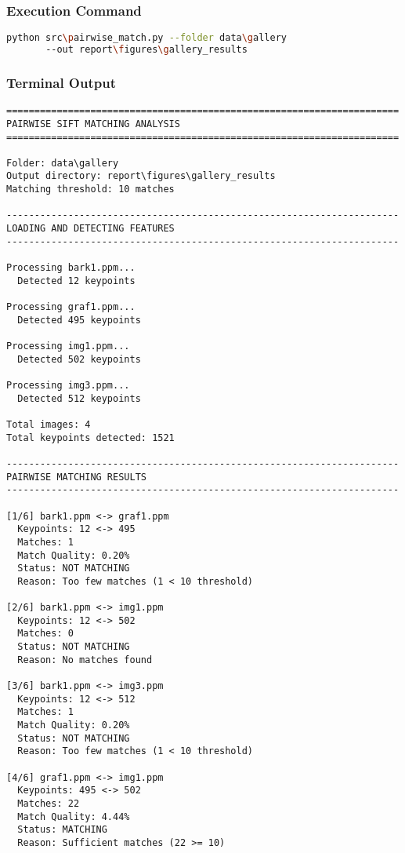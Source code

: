 \documentclass[12pt,a4paper]{article}
\begin{document}
\subsubsection{Execution Command}
\begin{lstlisting}[language=bash]
python src\pairwise_match.py --folder data\gallery 
       --out report\figures\gallery_results
\end{lstlisting}

\subsubsection{Terminal Output}
\begin{lstlisting}
======================================================================
PAIRWISE SIFT MATCHING ANALYSIS
======================================================================

Folder: data\gallery
Output directory: report\figures\gallery_results
Matching threshold: 10 matches

----------------------------------------------------------------------
LOADING AND DETECTING FEATURES
----------------------------------------------------------------------

Processing bark1.ppm...
  Detected 12 keypoints

Processing graf1.ppm...
  Detected 495 keypoints

Processing img1.ppm...
  Detected 502 keypoints

Processing img3.ppm...
  Detected 512 keypoints

Total images: 4
Total keypoints detected: 1521

----------------------------------------------------------------------
PAIRWISE MATCHING RESULTS
----------------------------------------------------------------------

[1/6] bark1.ppm <-> graf1.ppm
  Keypoints: 12 <-> 495
  Matches: 1
  Match Quality: 0.20%
  Status: NOT MATCHING
  Reason: Too few matches (1 < 10 threshold)

[2/6] bark1.ppm <-> img1.ppm
  Keypoints: 12 <-> 502
  Matches: 0
  Status: NOT MATCHING
  Reason: No matches found

[3/6] bark1.ppm <-> img3.ppm
  Keypoints: 12 <-> 512
  Matches: 1
  Match Quality: 0.20%
  Status: NOT MATCHING
  Reason: Too few matches (1 < 10 threshold)

[4/6] graf1.ppm <-> img1.ppm
  Keypoints: 495 <-> 502
  Matches: 22
  Match Quality: 4.44%
  Status: MATCHING
  Reason: Sufficient matches (22 >= 10)


\end{lstlisting}
\end{document}
